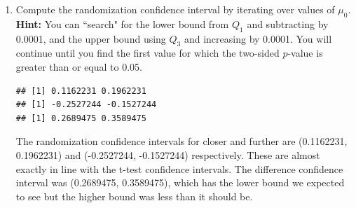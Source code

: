 \documentclass{article}\usepackage[]{graphicx}\usepackage[]{xcolor}
\makeatletter
\newenvironment{kframe}{%
 \def\at@end@of@kframe{}%
 \ifinner\ifhmode%
  \def\at@end@of@kframe{\end{minipage}}%
  \begin{minipage}{\columnwidth}%
 \fi\fi%
 \def\FrameCommand##1{\hskip\@totalleftmargin \hskip-\fboxsep
 \colorbox{shadecolor}{##1}\hskip-\fboxsep
     \hskip-\linewidth \hskip-\@totalleftmargin \hskip\columnwidth}%
 \MakeFramed {\advance\hsize-\width
   \@totalleftmargin\z@ \linewidth\hsize
   \@setminipage}}%
 {\par\unskip\endMakeFramed%
 \at@end@of@kframe}
\newenvironment{knitrout}{}{} %
\makeatother
\begin{document}
\begin{enumerate}
\begin{enumerate}
  \item Compute the randomization confidence interval by iterating over values of $\mu_0$.\\
  \textbf{Hint:} You can ``search" for the lower bound from $Q_1$ and subtracting by 0.0001, 
  and the upper bound using $Q_3$ and increasing by 0.0001. You will continue until you find 
  the first value for which the two-sided $p$-value is greater than or equal to 0.05.
\begin{knitrout}
\color{fgcolor}\begin{kframe}
\begin{verbatim}
## [1] 0.1162231 0.1962231
## [1] -0.2527244 -0.1527244
## [1] 0.2689475 0.3589475
\end{verbatim}
\end{kframe}
\end{knitrout}
The randomization confidence intervals for closer and further are (0.1162231, 0.1962231) and (-0.2527244, -0.1527244) respectively. These are almost exactly in line with the t-test confidence intervals. The difference confidence interval was (0.2689475, 0.3589475), which has the lower bound we expected to see but the higher bound was less than it should be.
\end{enumerate}
\end{enumerate}

\end{document}
